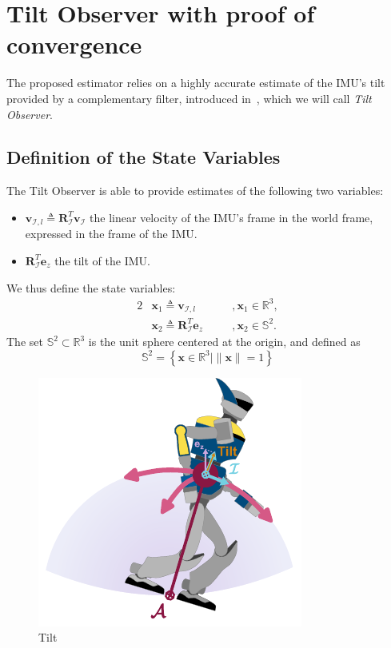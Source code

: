 \documentclass{IJCAS}
\begin{document}
\section{Tilt Observer with proof of convergence}
The proposed estimator relies on a highly accurate estimate of the IMU's tilt provided by a complementary filter, introduced in~\cite{benallegue2020LyapunovStableOrientationEstimatorHumanoids}, which we will call \emph{Tilt Observer}. 

\subsection{Definition of the State Variables}
The Tilt Observer is able to provide estimates of the following two variables: 
\begin{itemize}
    \item $\boldsymbol{v}_{\mathcal{I}, l} \triangleq \boldsymbol{R}^{T}_{\mathcal{I}} \boldsymbol{v}_{\mathcal{I}} $ the linear velocity of the IMU's frame in the world frame, expressed in the frame of the IMU.
    \item $\boldsymbol{R}^{T}_{\mathcal{I}} \boldsymbol{e}_z$ the tilt of the IMU.
\end{itemize}
We thus define the state variables: 
\begin{alignat}{2}
&\boldsymbol{x}_{1} \triangleq \boldsymbol{v}_{\mathcal{I}, l} \quad &&, \boldsymbol{x}_{1} \in \mathbb{R}^{3}, \label{eq:x1} \\
&\boldsymbol{x}_{2} \triangleq \boldsymbol{R}^{T}_{\mathcal{I}} \boldsymbol{e}_z \quad &&, \boldsymbol{x}_{2} \in \mathbb{S}^{2}. \label{eq:x2}
\end{alignat} 
The set $\mathbb{S}^{2} \subset \mathbb{R}^{3}$ is the unit sphere centered at the origin, and defined as
\begin{equation}
    \mathbb{S}^{2} = \left\{ \boldsymbol{x} \in \mathbb{R}^{3} \vert \lVert \boldsymbol{x} \rVert=1 \right\}
\end{equation}

\begin{figure}[!t]
\begin{center}
\includegraphics[width=0.5\columnwidth]{Uploaded/Images/tilt.pdf} 
\vskip -0.5pc
\caption{Tilt}\label{fig:tilt}
\end{center}
\vskip -1.5pc
\end{figure}
\end{document}
